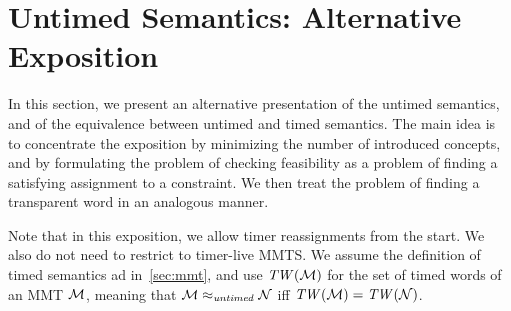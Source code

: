 \section{Untimed Semantics: Alternative Exposition}
\label{section constraints}
In this section, we present an alternative presentation of the untimed
semantics, and of the
equivalence between untimed and timed semantics. The main idea is to concentrate
the exposition by minimizing the number of introduced concepts, and
by formulating the problem of checking feasibility as a problem
of finding a satisfying assignment to a constraint. We then treat the problem
of finding a transparent word in an analogous manner.

Note that in this exposition, we allow timer reassignments from the start.
We also do not need to restrict to timer-live MMTS.
We assume the definition of timed semantics ad in~\ref{sec:mmt},
and use $\mathit{TW}({\mathcal M})$ for the set of timed words of an MMT ${\mathcal M}$, meaning
that ${\mathcal M} \approx_{\mathit{untimed}} {\mathcal N}$ iff $\mathit{TW}({\mathcal M}) = \mathit{TW}({\mathcal N})$.


